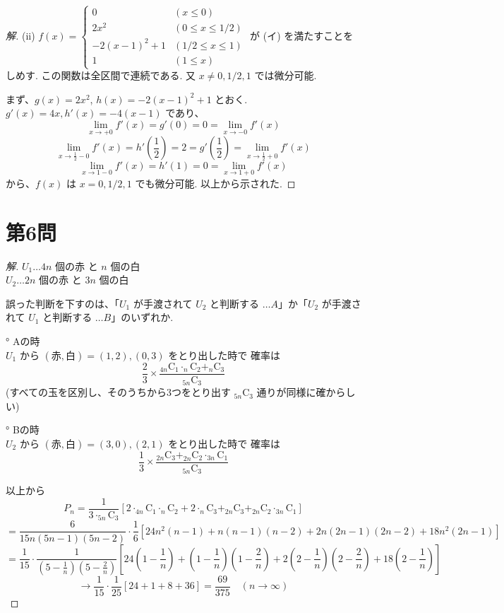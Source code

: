 \documentclass[../main.tex]{subfiles}
\begin{document}
\begin{proof}[解]
  \medskip
  (ii) $f(x) =
  \begin{cases} 0 & (x \le 0) \\ 2x^2 & (0 \le x \le 1/2) \\ -2(x-1)^2 + 1 & (1/2 \le x \le 1) \\ 1 & (1 \le x)
  \end{cases}$ が (イ) を満たすことをしめす. この関数は全区間で連続である. 又 $x \ne 0, 1/2, 1$ では微分可能.

  まず、$g(x) = 2x^2$, $h(x) = -2(x-1)^2 + 1$ とおく. $g'(x) = 4x, h'(x) = -4(x-1)$ であり、
  \[
    \lim_{x \to +0} f'(x) = g'(0) = 0 = \lim_{x \to -0} f'(x)
  \]
  \[
    \lim_{x \to \frac{1}{2} - 0} f'(x) = h'\left(\frac{1}{2}\right) = 2 = g'\left(\frac{1}{2}\right) = \lim_{x \to \frac{1}{2} + 0} f'(x)
  \]
  \[
    \lim_{x \to 1 - 0} f'(x) = h'(1) = 0 = \lim_{x \to 1 + 0} f'(x)
  \]
  から、$f(x)$ は $x = 0, 1/2, 1$ でも微分可能. 以上から示された.
\end{proof}

\newpage

\section*{第6問}

\begin{proof}[解]
  $U_1 \dots 4n$ 個の赤 と $n$ 個の白\\
  $U_2 \dots 2n$ 個の赤 と $3n$ 個の白

  誤った判断を下すのは、「$U_1$ が手渡されて $U_2$ と判断する $\dots A$」か「$U_2$ が手渡されて $U_1$ と判断する $\dots B$」のいずれか.

  ° Aの時\\
  $U_1$ から $(\text{赤}, \text{白}) = (1, 2), (0, 3)$ をとり出した時で 確率は
  \[
    \frac{2}{3} \times \frac{_{4n}\mathrm{C}_1 \cdot _n\mathrm{C}_2 + _n\mathrm{C}_3}{_{5n}\mathrm{C}_3}
  \]
  (すべての玉を区別し、そのうちから3つをとり出す $_{5n}\mathrm{C}_3$ 通りが同様に確からしい)

  ° Bの時\\
  $U_2$ から $(\text{赤}, \text{白}) = (3, 0), (2, 1)$ をとり出した時で 確率は
  \[
    \frac{1}{3} \times \frac{_{2n}\mathrm{C}_3 + _{2n}\mathrm{C}_2 \cdot _{3n}\mathrm{C}_1}{_{5n}\mathrm{C}_3}
  \]

  \medskip
  以上から
  \[
    P_n = \frac{1}{3 \cdot _{5n}\mathrm{C}_3} \left[ 2 \cdot _{4n}\mathrm{C}_1 \cdot _n\mathrm{C}_2 + 2 \cdot _n\mathrm{C}_3 + _{2n}\mathrm{C}_3 + _{2n}\mathrm{C}_2 \cdot _{3n}\mathrm{C}_1 \right]
  \]
  \[
    = \frac{6}{15n(5n-1)(5n-2)} \cdot \frac{1}{6} \left[ 24 n^2(n-1) + n(n-1)(n-2) + 2n(2n-1)(2n-2) + 18n^2(2n-1) \right]
  \]
  \[
    = \frac{1}{15} \cdot \frac{1}{(5 - \frac{1}{n})(5 - \frac{2}{n})} \left[ 24\left(1 - \frac{1}{n}\right) + \left(1 - \frac{1}{n}\right)\left(1 - \frac{2}{n}\right) + 2\left(2 - \frac{1}{n}\right)\left(2 - \frac{2}{n}\right) + 18\left(2 - \frac{1}{n}\right) \right]
  \]
  \[
    \longrightarrow \frac{1}{15} \cdot \frac{1}{25} [ 24 + 1 + 8 + 36 ] = \frac{69}{375} \quad (n \to \infty)
  \]
\end{proof}
\end{document}
